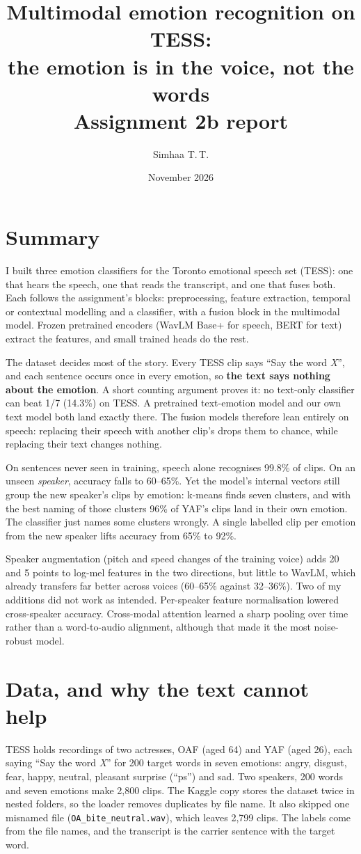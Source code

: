 \documentclass[11pt,a4paper]{article}
\title{Multimodal emotion recognition on TESS:\\ the emotion is in the voice, not the words\\[3pt]\large Assignment 2b report}
\author{Simhaa T.\,T.}
\date{November 2026}
\newcommand{\code}[1]{\texttt{#1}}
\begin{document}
\maketitle

\section{Summary}
I built three emotion classifiers for the Toronto emotional speech set (TESS): one that hears the speech, one that
reads the transcript, and one that fuses both. Each follows the assignment's blocks: preprocessing, feature
extraction, temporal or contextual modelling and a classifier, with a fusion block in the multimodal model. Frozen
pretrained encoders (WavLM Base+ for speech, BERT for text) extract the features, and small trained heads do the
rest.

The dataset decides most of the story. Every TESS clip says ``Say the word \emph{X}'', and each sentence occurs
once in every emotion, so \textbf{the text says nothing about the emotion}. A short counting argument proves it: no
text-only classifier can beat 1/7 (14.3\%) on TESS. A pretrained text-emotion model and our own text model both land
exactly there. The fusion models therefore lean entirely on speech: replacing their speech with another clip's
drops them to chance, while replacing their text changes nothing.

On sentences never seen in training, speech alone recognises 99.8\% of clips. On an unseen \emph{speaker}, accuracy
falls to 60--65\%. Yet the model's internal vectors still group the new speaker's clips by emotion: k-means finds
seven clusters, and with the best naming of those clusters 96\% of YAF's clips land in their own emotion. The
classifier just names some clusters wrongly. A single labelled clip per emotion from the new speaker lifts accuracy
from 65\% to 92\%.

Speaker augmentation (pitch and speed changes of the training voice) adds 20 and 5 points to log-mel features in
the two directions, but little to WavLM, which already transfers far better across voices (60--65\% against
32--36\%). Two of my additions did not work as intended. Per-speaker feature normalisation lowered cross-speaker
accuracy. Cross-modal attention learned a sharp pooling over time rather than a word-to-audio alignment, although
that made it the most noise-robust model.

\section{Data, and why the text cannot help}
TESS holds recordings of two actresses, OAF (aged 64) and YAF (aged 26), each saying ``Say the word \emph{X}'' for
200 target words in seven emotions: angry, disgust, fear, happy, neutral, pleasant surprise (``ps'') and sad. Two
speakers, 200 words and seven emotions make 2,800 clips. The Kaggle copy stores the dataset twice in nested
folders, so the loader removes duplicates by file name. It also skipped one misnamed file
(\code{OA\_bite\_neutral.wav}), which leaves 2,799 clips. The labels come
from the file names, and the transcript is the carrier sentence with the target word.
\end{document}

